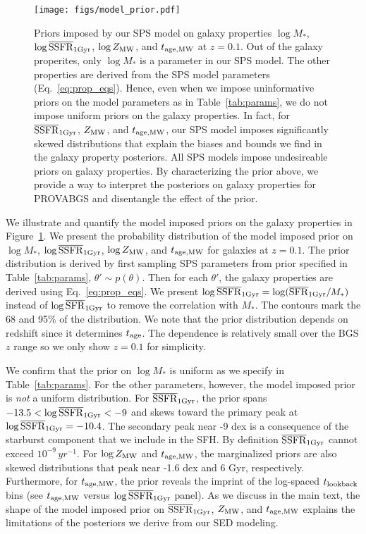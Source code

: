 \begin{figure}
\begin{center}
\texttt{[image: figs/model\_prior.pdf]}
    \caption{
    Priors imposed by our SPS model on galaxy properties $\log M_*$, $\log
    \overline{\rm SSFR}_{\rm 1 Gyr}$, $\log Z_{\rm MW}$, and $t_{\rm age, MW}$ at
    $z=0.1$. 
    Out of the galaxy properites, only $\log M_*$ is a parameter in our SPS
    model.
    The other properties are derived from the SPS model parameters
    (Eq.~\ref{eq:prop_eqs}). 
    Hence, even when we impose uninformative priors on the model parameters as
    in Table~\ref{tab:params}, we do not impose uniform priors on the galaxy
    properties. 
    In fact, for $\overline{\rm SSFR}_{\rm 1Gyr}$, $Z_{\rm MW}$, and $t_{\rm age, MW}$, our SPS model imposes
    significantly skewed distributions that explain the biases and bounds we
    find in the galaxy property posteriors.  
    All SPS models impose undesireable priors on galaxy properties. 
    By characterizing the prior above, we provide a way to interpret the
    posteriors on galaxy properties for PROVABGS and disentangle the effect of
    the prior. 
    }\label{fig:model_prior}
\end{center}
\end{figure}
We illustrate and quantify the model imposed priors on the galaxy
properties in Figure~\ref{fig:model_prior}. 
We present the probability distribution of the model imposed prior on 
$\log M_*$, $\log\overline{\rm SSFR}_{\rm 1Gyr}$, $\log Z_{\rm MW}$, and $t_{\rm age, MW}$ for galaxies at $z=0.1$.
The prior distribution is derived by first sampling SPS parameters from prior
specified in Table~\ref{tab:params}, $\theta'\sim p(\theta)$.
Then for each $\theta'$, the galaxy properties are derived using
Eq.~\ref{eq:prop_eqs}. 
We present $\log\overline{\rm SSFR}_{\rm 1Gyr} = \log(\overline{\rm SFR}_{\rm 1Gyr}/M_*)$ instead of $\log\overline{\rm SFR}_{\rm 1Gyr}$ to
remove the correlation with $M_*$.  
The contours mark the 68 and 95\% of the distribution. 
We note that the prior distribution depends on redshift since it determines
$t_{\rm age}$.
The dependence is relatively small over the BGS $z$ range so we only show
$z=0.1$ for simplicity. 

We confirm that the prior on $\log M_*$ is uniform as we specify in
Table~\ref{tab:params}. 
For the other parameters, however, the model imposed prior is \emph{not} a
uniform distribution. 
For $\overline{\rm SSFR}_{\rm 1Gyr}$, the prior spans $-13.5 < \log \overline{\rm SSFR}_{\rm 1Gyr} < -9$ and skews toward
the primary peak at $\log\overline{\rm SSFR}_{\rm 1Gyr} = -10.4$. 
The secondary peak near -9 dex is a consequence of the starburst component that
we include in the SFH. 
By definition $\overline{\rm SSFR}_{\rm 1Gyr}$ cannot exceed $10^{-9}\,yr^{-1}$. 
For $\log Z_{\rm MW}$ and $t_{\rm age, MW}$, the marginalized priors are also skewed
distributions that peak near -1.6 dex and 6 Gyr, respectively.
Furthermore, for $t_{\rm age, MW}$, the prior reveals the imprint of the log-spaced 
$t_{\rm lookback}$ bins (see $t_{\rm age, MW}$ versus $\log\overline{\rm SSFR}_{\rm 1Gyr}$ panel).
As we discuss in the main text, the shape of the model imposed prior on
$\overline{\rm SSFR}_{\rm 1Gyr}$, $Z_{\rm MW}$, and $t_{\rm age, MW}$ explains the limitations of the posteriors we
derive from our SED modeling.


